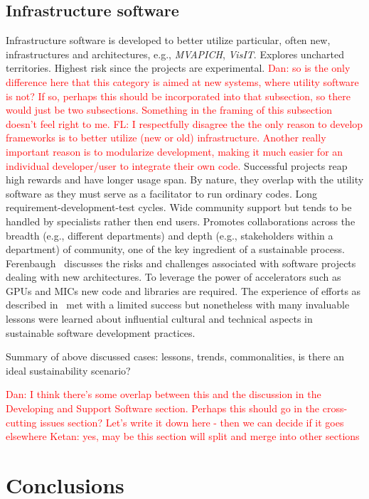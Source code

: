 \documentclass[11pt, oneside]{amsart}
\newcommand{\note}[1]{ {\textcolor{red}    { #1 }}}
\begin{document}
\subsection{Infrastructure software}
Infrastructure software is developed to better utilize particular, often new,
infrastructures and architectures, e.g., \emph{MVAPICH}, \emph{VisIT}. Explores
uncharted territories. Highest risk since the projects are experimental.
\note{Dan: so is the only difference here that this category is aimed at new
systems, where utility software is not?  If so, perhaps this should be
incorporated into that subsection, so there would just be two subsections.
Something in the framing of this subsection doesn't feel right to me.
FL: I respectfully disagree the the only reason to develop frameworks is
to better utilize (new or old) infrastructure. Another really important reason
is to modularize development, making it much easier for an individual developer/user
to integrate their own code.}
Successful projects reap high rewards and have longer usage span. By nature,
they overlap with the utility software as they must serve as a facilitator to
run ordinary codes. Long requirement-development-test cycles.  Wide community
support but tends to be handled by specialists rather then end users. Promotes
collaborations across the breadth (e.g., different departments) and depth
(e.g., stakeholders within a department) of community, one of the key
ingredient of a sustainable process. Ferenbaugh~\cite{Ferenbaugh_WSSSPE}
discusses the risks and challenges associated with software projects dealing
with new architectures. To leverage the power of accelerators such as GPUs and
MICs new code and libraries are required. The experience of efforts as
described in~\cite{Ferenbaugh_WSSSPE} met with a limited success but
nonetheless with many invaluable lessons were learned about influential
cultural and technical aspects in sustainable software development practices.

Summary of above discussed cases: lessons, trends, commonalities, is there an
ideal sustainability scenario?

\note{Dan: I think there's some overlap
  between this and the discussion in the Developing and Support
  Software section.  Perhaps this should go in the cross-cutting
  issues section?  Let's write it down here - then we can decide if it goes elsewhere}
\note{Ketan: yes, may be this section will split and merge into other sections}

\section{Conclusions} \label{sec:conclusions}
\end{document}
